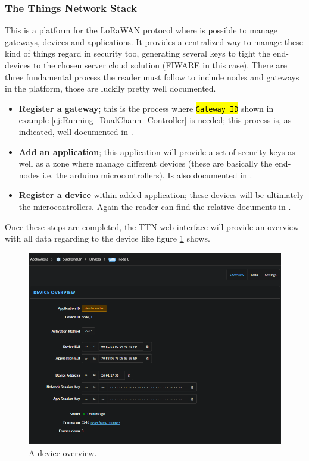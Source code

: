 \documentclass[11pt,a4paper,dvipsnames,twoside]{article}
\newcommand{\cmd}[1] {\hl{\texttt{#1}}}
\begin{document}
\subsubsection{The Things Network Stack}\label{sssec:TTN_Stack}
This is a platform for the LoRaWAN protocol where is possible to manage gateways, devices and applications. It provides a centralized way to manage these kind of things regard in security too, generating several keys to tight the end-devices to the chosen server cloud solution (FIWARE in this case). There are three fundamental process the reader must follow to include nodes and gateways in the platform, those are luckily pretty well documented. 

\begin{itemize}
  \item \textbf{Register a gateway}; this is the process where \cmd{Gateway ID} shown in example \ref{ej:Running_DualChann_Controller} is needed; this process is, as indicated, well documented in \cite{Gateway_reg}.
  \item \textbf{Add an application}; this application will provide a set of security keys as well as a zone where manage different devices (these are basically the end-nodes i.e. the arduino microcontrollers). Is also documented in \cite{Add_application}.
  \item \textbf{Register a device} within added application; these devices will be ultimately the microcontrollers. Again the reader can find the relative documents in \cite{Device_reg}. 
\end{itemize}

Once these steps are completed, the TTN web interface will provide an overview with all data regarding to the device like figure \ref{fig:dev_overview} shows. 

\begin{figure}[ht]
  \centering
  \includegraphics[width=.9\textwidth]{../pictures/TTN_dev_overview.png}
  \caption{A device overview.}
  \label{fig:dev_overview}
\end{figure}
\end{document}
